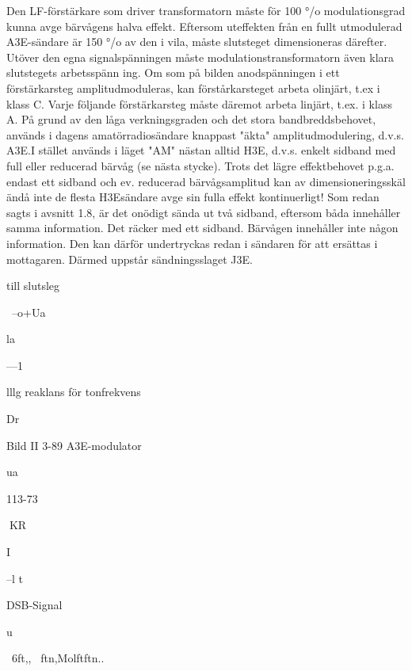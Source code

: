Den LF-förstärkare som driver transformatorn måste för 100 °/o modulationsgrad
kunna avge bärvågens halva effekt. Eftersom uteffekten från en fullt utmodulerad
A3E-sändare är 150 °/o av den i vila, måste
slutsteget dimensioneras därefter. Utöver
den egna signalspänningen måste modulationstransformatorn även klara slutstegets
arbetsspänn ing.
Om som på bilden anodspänningen i ett
förstärkarsteg amplitudmoduleras, kan förstårkarsteget arbeta olinjärt, t.ex i klass C.
Varje följande förstärkarsteg måste däremot
arbeta linjärt, t.ex. i klass A.
På grund av den låga verkningsgraden
och det stora bandbreddsbehovet, används
i dagens amatörradiosändare knappast
"äkta" amplitudmodulering, d.v.s. A3E.I stället används i läget "AM" nästan alltid H3E,
d.v.s. enkelt sidband med full eller reducerad bärvåg (se nästa stycke). Trots det lägre
effektbehovet p.g.a. endast ett sidband och
ev. reducerad bärvågsamplitud kan av dimensioneringsskäl ändå inte de flesta H3Esändare avge sin fulla effekt kontinuerligt!
Som redan sagts i avsnitt 1.8, är det onödigt
sända ut två sidband, eftersom båda innehåller samma information. Det räcker med
ett sidband. Bärvågen innehåller inte någon
information. Den kan därför undertryckas
redan i sändaren för att ersättas i mottagaren. Därmed uppstår sändningsslaget J3E.

till
slutsleg

~--o+Ua

la

---1

lllg reaklans
för tonfrekvens

Dr

Bild II 3-89 A3E-modulator

ua

113-73

KR

I

--l
t

DSB-Signal

u

~6ft,, ~ftn,Molftftn..

